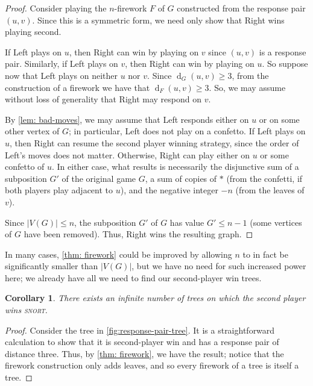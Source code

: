\documentclass[11pt]{article}
\newtheorem{corollary}[theorem]{Corollary}
\theoremstyle{definition}
\DeclareMathOperator{\dist}{d}
\begin{document}
\begin{proof}
    Consider playing the $n$-firework $F$ of $G$ constructed from the response
    pair $(u,v)$. Since this is a symmetric form, we need only show that Right
    wins playing second.

    If Left plays on $u$, then Right can win by playing on $v$ since $(u,v)$ is
    a response pair. Similarly, if Left plays on $v$, then Right can win by
    playing on $u$. So suppose now that Left plays on neither $u$ nor $v$.
    Since $\dist_G(u,v)\geq3$, from the construction of a firework we have that
    $\dist_F(u,v)\geq3$. So, we may assume without loss of generality that
    Right may respond on $v$.

    By \cref{lem: bad-moves}, we may assume that Left responds either on $u$ or
    on some other vertex of $G$; in particular, Left does not play on a
    confetto. If Left plays on $u$, then Right can resume the second player
    winning strategy, since the order of Left's moves does not matter.
    Otherwise, Right can play either on $u$ or some confetto of $u$. In either
    case, what results is necessarily the disjunctive sum of a subposition $G'$
    of the original game $G$, a sum of copies of $*$ (from the confetti, if
    both players play adjacent to $u$), and the negative integer $-n$ (from the
    leaves of $v$).
    
    Since $|V(G)|\leq n$, the subposition $G'$ of $G$ has value $G'\leq n-1$
    (some vertices of $G$ have been removed). Thus, Right wins the resulting
    graph.
\end{proof}

In many cases, \cref{thm: firework} could be improved by allowing $n$ to in
fact be significantly smaller than $|V(G)|$, but we have no need for such
increased power here; we already have all we need to find our second-player win
trees.

\begin{corollary}
    There exists an infinite number of trees on which the second player wins
    \textsc{snort}.
\end{corollary}

\begin{proof}
    Consider the tree in \cref{fig:response-pair-tree}. It is a straightforward
    calculation to show that it is second-player win and has a response pair of
    distance three. Thus, by \cref{thm: firework}, we have the result; notice
    that the firework construction only adds leaves, and so every firework of a
    tree is itself a tree.
\end{proof}
\end{document}
